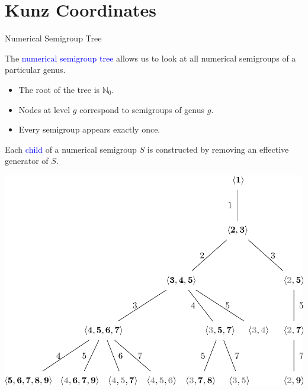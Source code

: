 \documentclass[10pt]{beamer}
\newcommand{\blue}[1]{\textcolor{blue}{#1}}
\newcommand{\N}{\mathbb{N}_0}
\begin{document}
\section{Kunz Coordinates}

\begin{frame}{Numerical Semigroup Tree}

The \blue{numerical semigroup tree} allows us to look at all numerical semigroups of a particular genus. 
\begin{itemize}
    \item The root of the tree is $\N$. 
    \item Nodes at level $g$ correspond to semigroups of genus $g$.
    \item Every semigroup appears exactly once. 
\end{itemize} 

\begin{block}{}
    Each \blue{child} of a numerical semigroup $S$ is constructed by removing an effective generator of $S$. 
\end{block}

\includegraphics[scale = .16]{Max/images/4-Figure1-1-1604546467.png}

\end{frame}

\end{document}
